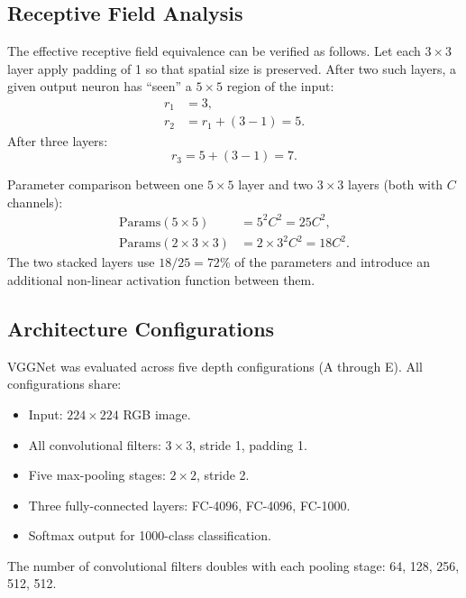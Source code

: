 \documentclass[12pt,a4paper]{article}
\begin{document}
\subsection{Receptive Field Analysis}

The effective receptive field equivalence can be verified as follows. Let each $3\times3$ layer apply padding of 1 so that spatial size is preserved. After two such layers, a given output neuron has ``seen'' a $5\times5$ region of the input:
\begin{align}
  r_1 &= 3, \\
  r_2 &= r_1 + (3-1) = 5.
\end{align}
After three layers:
\begin{equation}
  r_3 = 5 + (3-1) = 7.
\end{equation}

Parameter comparison between one $5\times5$ layer and two $3\times3$ layers (both with $C$ channels):
\begin{align}
  \text{Params}(5\times5) &= 5^2 C^2 = 25 C^2, \\
  \text{Params}(2 \times 3\times3) &= 2 \times 3^2 C^2 = 18 C^2.
\end{align}
The two stacked layers use $18/25 = 72\%$ of the parameters and introduce an additional non-linear activation function between them.

\subsection{Architecture Configurations}

VGGNet was evaluated across five depth configurations (A through E). All configurations share:
\begin{itemize}[leftmargin=2em]
  \item Input: $224\times224$ RGB image.
  \item All convolutional filters: $3\times3$, stride 1, padding 1.
  \item Five max-pooling stages: $2\times2$, stride 2.
  \item Three fully-connected layers: FC-4096, FC-4096, FC-1000.
  \item Softmax output for 1000-class classification.
\end{itemize}

The number of convolutional filters doubles with each pooling stage: 64, 128, 256, 512, 512.
\end{document}
